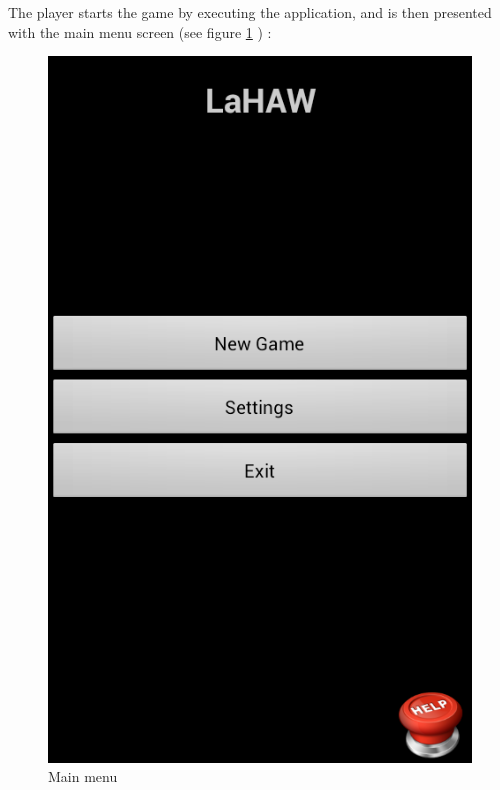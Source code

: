 The player starts the game by executing the application, and is then presented with the main menu screen (see figure \ref{fig:mainmenu} ) :
\begin{figure}[ht]
	\begin{minipage}[b]{0.325\linewidth}
		\centering
		\includegraphics[scale=0.225]{img/Screenshot_MainMenu.png}
		\caption{Main menu      }
		\label{fig:mainmenu}
	\end{minipage}
	\begin{minipage}[b]{0.325\linewidth}
		\centering

\end{minipage}
\end{figure}
